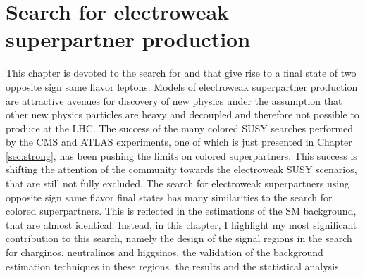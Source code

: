 \chapter{Search for electroweak \\superpartner production}\label{sec:ewk}
\noindent\justify
This chapter is devoted to the search for \firstcharg\PSGczDt and \PSGczDo\PSGczDo that give rise to a final state of two opposite sign same flavor leptons. 
Models of electroweak superpartner production are attractive avenues for discovery of new physics under the assumption that other new physics particles are heavy and decoupled and therefore not possible to produce at the LHC.  
The success of the many colored SUSY searches performed by the CMS and ATLAS experiments, one of which is just presented in Chapter \ref{sec:strong}, has been pushing the limits on colored superpartners. 
This success is shifting the attention of the community towards the electroweak SUSY scenarios, that are still not fully excluded. 
\newpara
\noindent\justify
The search for electroweak superpartners using opposite sign same flavor final states has many similarities to the search for colored superpartners. 
This is reflected in the estimations of the SM background, that are almost identical. 
Instead, in this chapter, I highlight my most significant contribution to this search, namely the design of the signal regions in the search for charginos, neutralinos and higgsinos, the validation of the background estimation techniques in these regions, the results and the statistical analysis. 
\newpage

